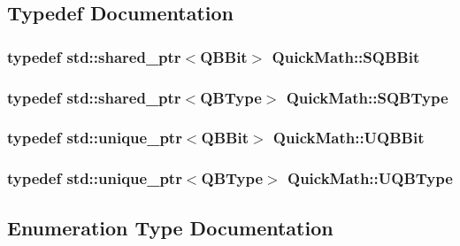 \subsection{Typedef Documentation}
\hypertarget{namespaceQuickMath_a9d86d757cbfdd10689287a8f6d3f3b99}{}
\subsubsection[{S\+Q\+B\+Bit}]{\setlength{\rightskip}{0pt plus 5cm}typedef std\+::shared\+\_\+ptr$<${\bf Q\+B\+Bit}$>$ {\bf Quick\+Math\+::\+S\+Q\+B\+Bit}}\label{namespaceQuickMath_a9d86d757cbfdd10689287a8f6d3f3b99}
\hypertarget{namespaceQuickMath_ac7fba3fe1fa7904fe139bbe68de92923}{}
\subsubsection[{S\+Q\+B\+Type}]{\setlength{\rightskip}{0pt plus 5cm}typedef std\+::shared\+\_\+ptr$<${\bf Q\+B\+Type}$>$ {\bf Quick\+Math\+::\+S\+Q\+B\+Type}}\label{namespaceQuickMath_ac7fba3fe1fa7904fe139bbe68de92923}
\hypertarget{namespaceQuickMath_a8bf3ddd5067daacf7c170b07a2fe79a1}{}
\subsubsection[{U\+Q\+B\+Bit}]{\setlength{\rightskip}{0pt plus 5cm}typedef std\+::unique\+\_\+ptr$<${\bf Q\+B\+Bit}$>$ {\bf Quick\+Math\+::\+U\+Q\+B\+Bit}}\label{namespaceQuickMath_a8bf3ddd5067daacf7c170b07a2fe79a1}
\hypertarget{namespaceQuickMath_af54af2708effd817452548da857ba076}{}
\subsubsection[{U\+Q\+B\+Type}]{\setlength{\rightskip}{0pt plus 5cm}typedef std\+::unique\+\_\+ptr$<${\bf Q\+B\+Type}$>$ {\bf Quick\+Math\+::\+U\+Q\+B\+Type}}\label{namespaceQuickMath_af54af2708effd817452548da857ba076}


\subsection{Enumeration Type Documentation}
\hypertarget{namespaceQuickMath_aec13b08c42d9f8e688241623c8b379a0}{}
